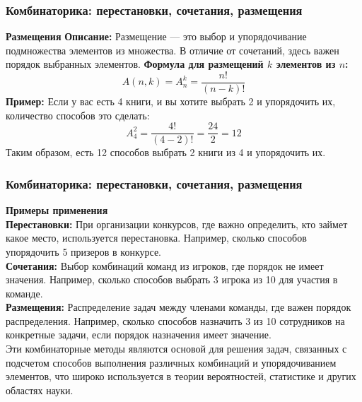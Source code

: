 \documentclass[aspectratio=169]{beamer}
\begin{document}
\begin{frame}
\frametitle{Комбинаторика: перестановки, сочетания, размещения}
\textbf{Размещения}
\newline
\textbf{Описание:} Размещение — это выбор и упорядочивание подмножества элементов из множества. В отличие от сочетаний, здесь важен порядок выбранных элементов.
\newline
\textbf{Формула для размещений \( k \) элементов из \( n \):}
  \[
  A(n, k) = A_n^k = \frac{n!}{(n - k)!}
  \]
\textbf{Пример:} Если у вас есть 4 книги, и вы хотите выбрать 2 и упорядочить их, количество способов это сделать:
  \[
  A_4^2 = \frac{4!}{(4 - 2)!} = \frac{24}{2} = 12
  \]
Таким образом, есть 12 способов выбрать 2 книги из 4 и упорядочить их.
\end{frame}

\begin{frame}
\frametitle{Комбинаторика: перестановки, сочетания, размещения}
\textbf{Примеры применения}
\newline\\
\textbf{Перестановки:} При организации конкурсов, где важно определить, кто займет какое место, используется перестановка. Например, сколько способов упорядочить 5 призеров в конкурсе.
\newline\\
\textbf{Сочетания:} Выбор комбинаций команд из игроков, где порядок не имеет значения. Например, сколько способов выбрать 3 игрока из 10 для участия в команде.
\newline\\
\textbf{Размещения:} Распределение задач между членами команды, где важен порядок распределения. Например, сколько способов назначить 3 из 10 сотрудников на конкретные задачи, если порядок назначения имеет значение.
\newline\\
Эти комбинаторные методы являются основой для решения задач, связанных с подсчетом способов выполнения различных комбинаций и упорядочиванием элементов, что широко используется в теории вероятностей, статистике и других областях науки.
\end{frame}
\end{document}

